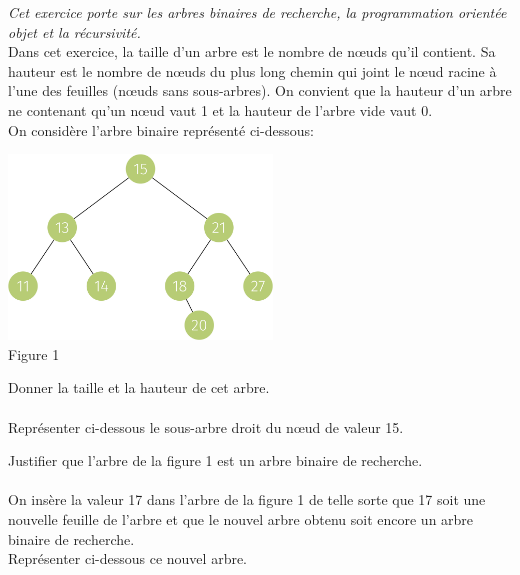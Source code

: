 \documentclass[a4paper,12pt,article,firamath]{nsi}
\begin{document}
\resetquestion
\textit{Cet exercice porte sur les arbres binaires de recherche, la programmation orientée
    objet et la récursivité.}\\

Dans cet exercice, la taille d'un arbre est le nombre de nœuds qu'il contient. Sa hauteur
est le nombre de nœuds du plus long chemin qui joint le nœud racine à l'une des
feuilles (nœuds sans sous-arbres). On convient que la hauteur d'un arbre ne contenant
qu'un nœud vaut 1 et la hauteur de l'arbre vide vaut 0.\\

On considère l'arbre binaire représenté ci-dessous:
\begin{center}
    \includegraphics[width=7cm]{img/fig1.png}\\
    Figure 1
\end{center}
Donner la taille et la hauteur de cet arbre.\\

\\

\question Représenter ci-dessous le sous-arbre droit du n\oe ud de valeur 15.\\


\question Justifier que l'arbre de la figure 1 est un arbre binaire de recherche.\\

\\


On insère la valeur 17 dans l'arbre de la figure 1 de telle sorte que 17 soit une
nouvelle feuille de l'arbre et que le nouvel arbre obtenu soit encore un arbre
binaire de recherche.\\

\question Représenter ci-dessous ce nouvel arbre.\\
\end{document}
